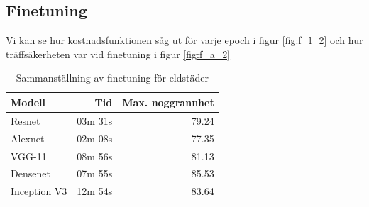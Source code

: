 \documentclass[]{kththesis}
\begin{document}
\subsection{Finetuning}
Vi kan se hur kostnadsfunktionen såg ut för varje epoch i figur \ref{fig:f_l_2} och hur träffsäkerheten var vid finetuning i figur \ref{fig:f_a_2}

\begin{table}
  \centering
  \begin{tabular}{|l|r|r|}
    Modell & Tid & Max. noggrannhet \\ 
    \hline
    Resnet       & 03m 31s & 79.24 \\
    Alexnet      & 02m 08s & 77.35 \\
    VGG-11       & 08m 56s & 81.13 \\
    Densenet     & 07m 55s & 85.53 \\
    Inception V3 & 12m 54s & 83.64 \\
  \end{tabular}
  \caption{Sammanställning av finetuning för eldstäder}
\end{table}
\end{document}
